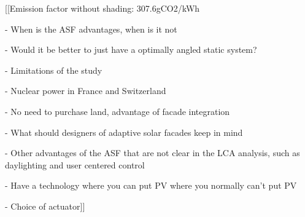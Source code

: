 




[[Emission factor without shading: 307.6gCO2/kWh

- When is the ASF advantages, when is it not

- Would it be better to just have a optimally angled static system?

- Limitations of the study

- Nuclear power in France and Switzerland

- No need to purchase land, advantage of facade integration

- What should designers of adaptive solar facades keep in mind 

- Other advantages of the ASF that are not clear in the LCA analysis, such as daylighting and user centered control 

- Have a technology where you can put PV where you normally can't put PV

- Choice of actuator]]
